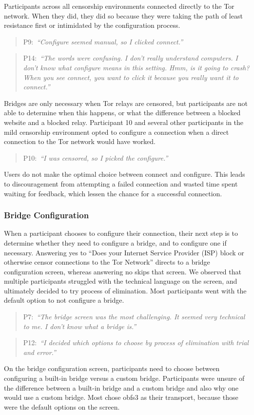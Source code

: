 \documentclass[USenglish,oneside,twocolumn]{article}
\newcommand{\pquote}[2]{
\begin{quotation}
\noindent #1:~\textit{``#2''}
\end{quotation}
}
\begin{document}
Participants across all censorship environments connected directly to the Tor network. When they did, they did so because they were taking the path of least resistance first or intimidated by the configuration process. 
\pquote{P9}{Configure seemed manual, so I clicked connect.}
\pquote{P14}{The words were confusing. I don't really understand computers. I don't know what configure means in this setting. Hmm, is it going to crash? When you see connect, you want to click it because you really want it to connect.}

Bridges are only necessary when Tor relays are censored, but participants are not able to determine when this happens, or what the difference between a blocked website and a blocked relay. Participant 10 and several other participants in the mild censorship environment opted to configure a connection when a direct connection to the Tor network would have worked. 

\pquote{P10}{I was censored, so I picked the configure.}

Users do not make the optimal choice between connect and configure. This leads to discouragement from attempting a failed connection and wasted time spent waiting for feedback, which lessen the chance for a successful connection. 

\subsubsection{Bridge Configuration} 
When a participant chooses to configure their connection, their next step is to determine whether they need to configure a bridge, and to configure one if necessary. Answering yes to ``Does your Internet Service Provider (ISP) block or otherwise censor connections to the Tor Network'' directs to a bridge configuration screen, whereas answering no skips that screen. We observed that multiple participants struggled with the technical language on the screen, and ultimately decided to try process of elimination. Most participants went with the default option to not configure a bridge. 

\pquote{P7}{The bridge screen was the most challenging. It seemed very technical to me. I don't know what a bridge is.}
\pquote{P12}{I decided which options to choose by process of elimination with trial and error.}

On the bridge configuration screen, participants need to choose between configuring a built-in bridge versus a custom bridge. Participants were unsure of the difference between a built-in bridge and a custom bridge and also why one would use a custom bridge. Most chose obfs3 as their transport, because those were the default options on the screen. 
\end{document}
